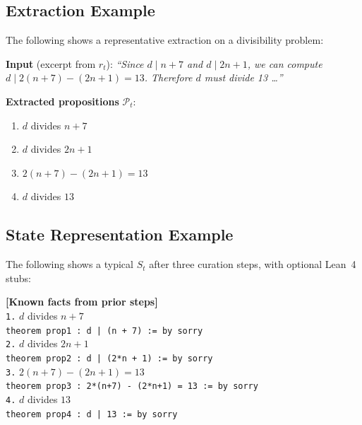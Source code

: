 \subsection{Extraction Example}
\label{app:extraction_example}

The following shows a representative extraction on a divisibility problem:

\begin{mdframed}[frametitle={Extraction Example}, frametitlerule=true,
    frametitlebackgroundcolor=gray!15, backgroundcolor=gray!5,
    innertopmargin=6pt, innerbottommargin=6pt]
\small
\textbf{Input} (excerpt from $r_t$):
\textit{``Since $d \mid n+7$ and $d \mid 2n+1$, we can compute $d \mid 2(n+7)-(2n+1) = 13$. Therefore $d$ must divide 13 \ldots''}

\medskip
\textbf{Extracted propositions} $\mathcal{P}_t$:
\begin{enumerate}[noitemsep,topsep=2pt,label=\arabic*.]
  \item $d$ divides $n + 7$
  \item $d$ divides $2n + 1$
  \item $2(n+7) - (2n+1) = 13$
  \item $d$ divides $13$
\end{enumerate}
\end{mdframed}

\subsection{State Representation Example}
\label{app:state_example}

The following shows a typical $S_t$ after three curation steps, with optional Lean~4 stubs:

\begin{mdframed}[backgroundcolor=gray!5, innertopmargin=6pt, innerbottommargin=6pt]
\small
\textbf{[Known facts from prior steps]}\\[4pt]
\texttt{1.} $d$ divides $n + 7$\\
\quad\texttt{theorem prop1 : d | (n + 7) := by sorry}\\[3pt]
\texttt{2.} $d$ divides $2n + 1$\\
\quad\texttt{theorem prop2 : d | (2*n + 1) := by sorry}\\[3pt]
\texttt{3.} $2(n+7) - (2n+1) = 13$\\
\quad\texttt{theorem prop3 : 2*(n+7) - (2*n+1) = 13 := by sorry}\\[3pt]
\texttt{4.} $d$ divides $13$\\
\quad\texttt{theorem prop4 : d | 13 := by sorry}
\end{mdframed}

